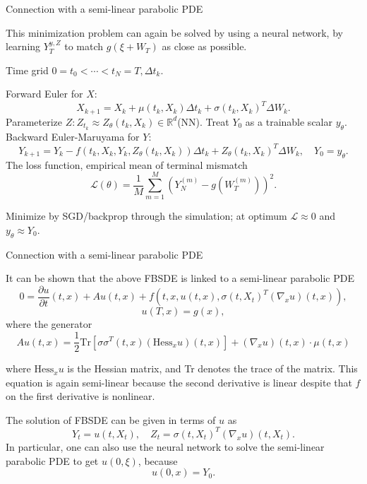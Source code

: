 \documentclass{beamer}
\begin{document}
\begin{frame}{Connection with a semi-linear parabolic PDE}

    {\footnotesize \footnotesize
    \par This minimization problem can again be solved by using a neural network, 
    by learning \( Y_T^{y,Z} \) to match \( g(\xi + W_T) \) as close as possible.
    \par Time grid \( 0 = t_0 < \cdots < t_N = T, \Delta t_k \).
    \par Forward Euler for \( X \):
    \[
    X_{k+1} = X_k + \mu(t_k, X_k)\Delta t_k + \sigma(t_k, X_k)^T\Delta W_k.
    \]
     \pause Parameterize \( Z: Z_{t_k} \approx Z_\theta(t_k, X_k) \in \mathbb{R}^d \)(NN). 
    Treat \( Y_0 \) as a trainable scalar \( y_\theta \). Backward Euler-Maruyama for \( Y \):
    \[
    Y_{k+1} = Y_k - f(t_k, X_k, Y_k, Z_\theta(t_k, X_k))\Delta t_k + Z_\theta(t_k, X_k)^T\Delta W_k, \quad Y_0 = y_\theta.
    \]
     \pause The loss function, empirical mean of terminal mismatch
    \[
\mathcal{L}(\theta) = \frac{1}{M}\sum_{m=1}^{M}\left(Y^{(m)}_N - g(W^{(m)}_T)\right)^2.
\]

Minimize by SGD/backprop through the simulation; at optimum \( \mathcal{L} \approx 0 \) and \( y_\theta \approx Y_0 \).

    }
    
\end{frame}
\begin{frame}{Connection with a semi-linear parabolic PDE}

    {\footnotesize \footnotesize
    \par It can be shown that the above FBSDE is linked to a semi-linear parabolic PDE
\[
0 = \frac{\partial u}{\partial t}(t,x) + Au(t,x) + f(t,x,u(t,x),\sigma(t,X_t)^T(\nabla_x u)(t,x)),
\]
\[
u(T,x) = g(x),
\]
 \pause where the generator
\[
Au(t,x) = \frac{1}{2} \text{Tr} \left[ \sigma \sigma^T(t,x)(\text{Hess}_x u)(t,x) \right] + (\nabla_x u)(t,x) \cdot \mu(t,x)
\]
\par where \(\text{Hess}_x u\) is the Hessian matrix, and Tr denotes the trace of the matrix. 
This equation is again semi-linear because the second derivative is linear despite that \(f\) 
on the first derivative is nonlinear. 
\par  \pause The solution of FBSDE can be given in terms of \(u\) as
\[
Y_t = u(t,X_t), \quad Z_t = \sigma(t,X_t)^T(\nabla_x u)(t,X_t).
\]
In particular, one can also use the neural network to solve the semi-linear parabolic PDE to get \(u(0,\xi)\), because
\[
u(0,x) = Y_0.
\]
    }
    
\end{frame}



    
\end{document}
